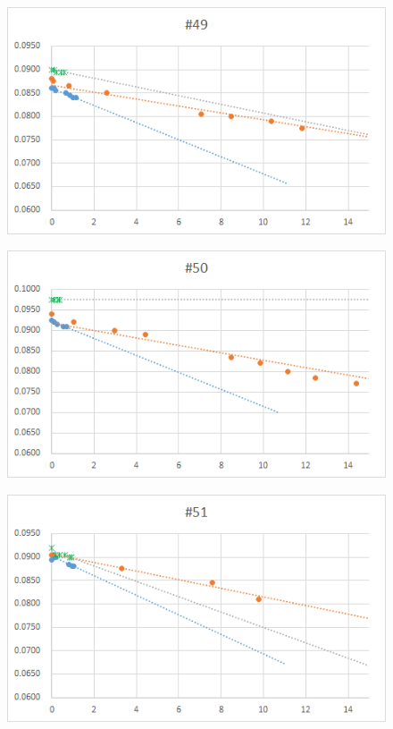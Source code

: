 \documentclass[12pt,a4paper]{jarticle}
\begin{document}
\begin{figure}[htbp]
  \centering
     \includegraphics[width=120mm]{vol_049.png}
\end{figure}
\begin{figure}[htbp]
  \centering
     \includegraphics[width=120mm]{vol_050.png}
\end{figure}
\begin{figure}[htbp]
  \centering
     \includegraphics[width=120mm]{vol_051.png}
\end{figure}
\end{document}
